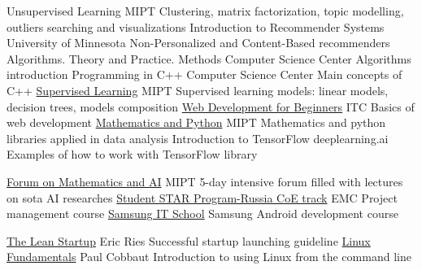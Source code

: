 \documentclass[
	a4paper,
]{fortysecondscv}
\begin{document}
\newpage
\makebacksidebar


\begin{cvtable}[1.5]
        {Unsupervised Learning}
        {MIPT}
        {Clustering, matrix factorization, topic modelling, outliers 
         searching and visualizations}
        {Introduction to Recommender Systems}
        {University of Minnesota}
        {Non-Personalized and Content-Based recommenders}
        {Algorithms. Theory and Practice. Methods}
        {Computer Science Center}
        {Algorithms introduction}
        {Programming in C++}
        {Computer Science Center}
        {Main concepts of C++}
        {\href{https://coursera.org/share/e50e6899962fe4d392fe65f6d9a60472}
        {Supervised Learning}}
        {MIPT}
        {Supervised learning models: linear models, decision trees, models composition}
        {\href{https://stepik.org/cert/321173}
        {Web Development for Beginners}}
        {ITC}
        {Basics of web development}
        {\href{https://coursera.org/share/faf5859452fbdda8a36084effc34793a}
        {Mathematics and Python}}
        {MIPT}
        {Mathematics and python libraries applied in data analysis}
        {Introduction to TensorFlow}
        {deeplearning.ai}
        {Examples of how to work with TensorFlow library}
\end{cvtable}

\begin{cvtable}[1.5]
        {\href{https://vk.com/math_ai}
        {Forum on Mathematics and AI}}
        {MIPT}
        {5-day intensive forum filled with lectures on sota AI researches}
        {\href{https://education.dellemc.com/content/emc/en-us/student-star.html}
        {Student STAR Program-Russia CoE track}}
        {EMC}
        {Project management course}
        {\href{https://myitschool.ru/}
        {Samsung IT School}}
        {Samsung}
        {Android development course}
\end{cvtable}

\begin{cvtable}[1.5]
        {\href{https://en.wikipedia.org/wiki/The_Lean_Startup}
        {The Lean Startup}}
        {Eric Ries}
        {Successful startup launching guideline}
        {\href{http://linux-training.be/linuxfun.pdf}
        {Linux Fundamentals}}
        {Paul Cobbaut}
        {Introduction to using Linux from the command line}
\end{cvtable}
\end{document}
